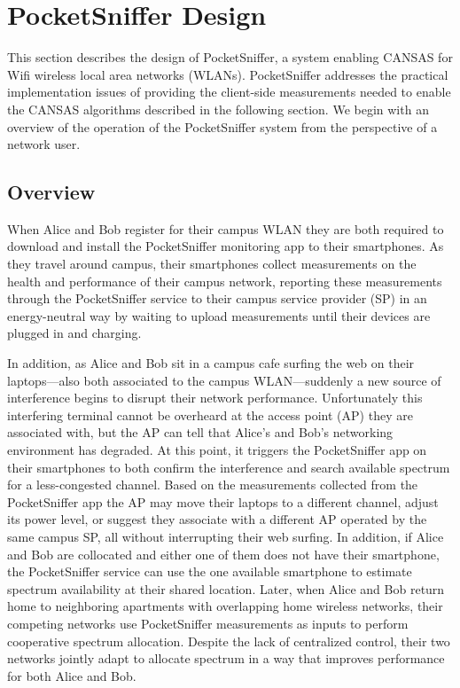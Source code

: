 \section{PocketSniffer Design}
\label{sec-design}

This section describes the design of PocketSniffer, a system enabling CANSAS
for Wifi wireless local area networks (WLANs). PocketSniffer addresses the
practical implementation issues of providing the client-side measurements
needed to enable the CANSAS algorithms described in the following section.
We begin with an overview of the operation of the PocketSniffer system from
the perspective of a network user.

\subsection{Overview}

When Alice and Bob register for their campus WLAN they are both required to
download and install the PocketSniffer monitoring app to their smartphones.
As they travel around campus, their smartphones collect measurements on the
health and performance of their campus network, reporting these measurements
through the PocketSniffer service to their campus service provider (SP) in an
energy-neutral way by waiting to upload measurements until their devices are
plugged in and charging.

In addition, as Alice and Bob sit in a campus cafe surfing the web on their
laptops---also both associated to the campus WLAN---suddenly a new source of
interference begins to disrupt their network performance. Unfortunately this
interfering terminal cannot be overheard at the access point (AP) they are
associated with, but the AP can tell that Alice's and Bob's networking
environment has degraded. At this point, it triggers the PocketSniffer app on
their smartphones to both confirm the interference and search available
spectrum for a less-congested channel. Based on the measurements collected
from the PocketSniffer app the AP may move their laptops to a different
channel, adjust its power level, or suggest they associate with a different
AP operated by the same campus SP, all without interrupting their web
surfing. In addition, if Alice and Bob are collocated and either one of them
does not have their smartphone, the PocketSniffer service can use the one
available smartphone to estimate spectrum availability at their shared
location. Later, when Alice and Bob return home to neighboring apartments
with overlapping home wireless networks, their competing networks use
PocketSniffer measurements as inputs to perform cooperative spectrum
allocation. Despite the lack of centralized control, their two networks
jointly adapt to allocate spectrum in a way that improves performance for
both Alice and Bob.

